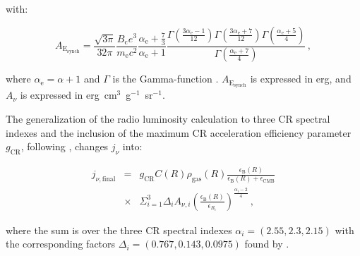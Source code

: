 \documentclass[traditabstract]{aa}
\newcommand{\rmn}{\mathrm}
\begin{document}
\begin{appendix}
with:

\begin{equation}
A_{\rmn{E_{synch}}} = \frac{\sqrt{3\pi}}{32\pi}\frac{B_{\rmn{c}}e^{3}}{m_{\rmn{e}}c^{2}}\frac{\alpha_{\rmn{e}}+\frac{7}{3}}{\alpha_{\rmn{e}}+1}\frac{\Gamma\left(\frac{3\alpha_{\rmn{e}}-1}{12}\right)\Gamma\left(\frac{3\alpha_{\rmn{e}}+7}{12}\right)\Gamma\left(\frac{\alpha_{\rmn{e}}+5}{4}\right)}{\Gamma\left(\frac{\alpha_{\rmn{e}}+7}{4}\right)} \, ,
\end{equation}

where $\alpha_{\rmn{e}}=\alpha+1$ and $\Gamma$ is the Gamma-function \citep{1965hmfw.book.....A}. $A_{\rmn{E_{synch}}}$ is expressed in erg, and $A_{\nu}$ is expressed in erg~cm$^{3}$~g$^{-1}$~sr$^{-1}$. 

The generalization of the radio luminosity calculation to three CR spectral indexes and the inclusion of the maximum CR acceleration efficiency parameter $g_{\rmn{CR}}$, following \cite{2010MNRAS.409..449P}, changes $j_{\nu}$ into:

\begin{eqnarray}
j_{\nu,\rmn{final}} & = &g_{\rmn{CR}} C(R) \rho_{\rmn{gas}}(R) \frac{\epsilon_{\rmn{B}}(R)}{\epsilon_{\rmn{B}}(R)+\epsilon_{\rmn{CMB}}} \nonumber \\
& \times & \Sigma_{i=1}^{3} \Delta_{i} A_{\nu,i} \left( \frac{\epsilon_{\rmn{B}}(R)}{\epsilon_{B_{\rmn{c}}}} \right)^{\frac{\alpha_{i}-2}{4}}  \, ,
\end{eqnarray}

where the sum is over the three CR spectral indexes $\alpha_{i}=(2.55,2.3,2.15)$ with the corresponding factors $\Delta_{i} = (0.767, 0.143, 0.0975)$ found by \cite{2010MNRAS.409..449P}. 
 



\end{appendix}
\end{document}
